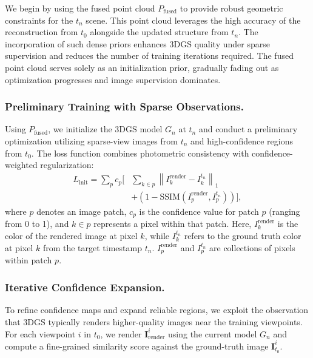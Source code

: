 \documentclass[letterpaper]{article} %
\begin{document}
We begin by using the fused point cloud \(P_{\text{fused}}\) to provide robust geometric constraints for the \(t_n\) scene. This point cloud leverages the high accuracy of the reconstruction from \(t_0\) alongside the updated structure from \(t_n\). The incorporation of such dense priors enhances 3DGS quality under sparse supervision and reduces the number of training iterations required. The fused point cloud serves solely as an initialization prior, gradually fading out as optimization progresses and image supervision dominates.


\subsubsection{Preliminary Training with Sparse Observations.}
Using \(P_{\text{fused}}\), we initialize the 3DGS model \(G_n\) at \(t_n\) and conduct a preliminary optimization utilizing sparse-view images from \(t_n\) and high-confidence regions from \(t_0\). The loss function combines photometric consistency with confidence-weighted regularization:
%
\begin{equation}
\begin{aligned}
L_{\text{init}} = \sum_{p} c_p \Bigg[
    &\sum_{k \in p} \left\| I_k^{\text{render}} - I_k^{t_n} \right\|_1  \\
    &+ \left( 1 - \text{SSIM}(I_p^{\text{render}}, I_p^{t_n}) \right)
\Bigg],
\end{aligned}
\end{equation}
%
where \(p\) denotes an image patch, \(c_p\) is the confidence value for patch \(p\) (ranging from 0 to 1), and \(k \in p\) represents a pixel within that patch. Here, \(I_k^{\text{render}}\) is the color of the rendered image at pixel \(k\), while \(I_k^{t_n}\) refers to the ground truth color at pixel \(k\) from the target timestamp \(t_n\). \(I_p^{\text{render}}\) and \(I_p^{t_n}\) are collections of pixels within patch \(p\).

\subsubsection{Iterative Confidence Expansion.}
To refine confidence maps and expand reliable regions, we exploit the observation that 3DGS typically renders higher-quality images near the training viewpoints. For each viewpoint \(i\) in \(t_0\), we render \(\mathbf{I}_{\text{render}}^i\) using the current model \(G_n\) and compute a fine-grained similarity score against the ground-truth image \(\mathbf{I}_{t_0}^i\).
\end{document}
